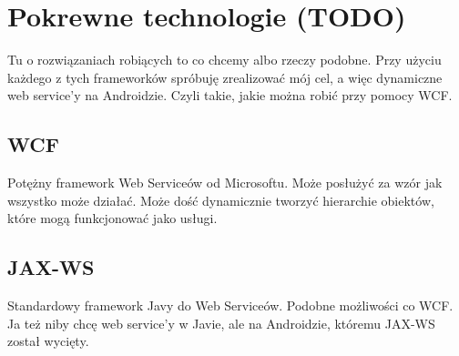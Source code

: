 \chapter{Pokrewne technologie (TODO)}
Tu o rozwiązaniach robiących to co chcemy albo rzeczy podobne. Przy użyciu każdego z tych frameworków spróbuję zrealizować mój cel, a więc dynamiczne web service'y na Androidzie. Czyli takie, jakie można robić przy pomocy WCF.

%
%
%
%

\section{WCF}
Potężny framework Web Serviceów od Microsoftu. Może posłużyć za wzór jak wszystko może działać. Może dość dynamicznie tworzyć hierarchie obiektów, które mogą funkcjonować jako usługi.


\section{JAX-WS}
Standardowy framework Javy do Web Serviceów. Podobne możliwości co WCF. Ja też niby chcę web service'y w Javie, ale na Androidzie, któremu JAX-WS został wycięty.

